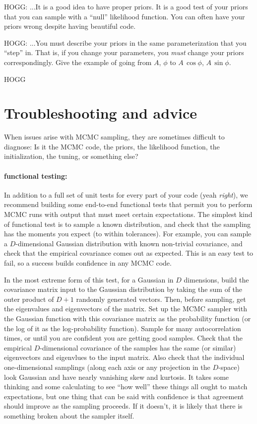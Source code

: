 \documentclass[12pt,twoside,pdftex]{article}
\begin{document}
HOGG: ...It is a good idea to have proper priors.
It is a good test of your priors that you can sample with a ``null'' likelihood function.
You can often have your priors wrong despite having beautiful code.

HOGG: ...You must describe your priors in the same parameterization that you ``step'' in.
That is, if you change your parameters, you \emph{must} change your priors correspondingly.
Give the example of going from $A$, $\phi$ to $A\,\cos\phi$, $A\,\sin\phi$.

\begin{problem}
HOGG
\end{problem}

\section{Troubleshooting and advice}\label{sec:troubleshooting}

When issues arise with MCMC sampling,
  they are sometimes difficult to diagnose:
Is it the MCMC code, the priors, the likelihood function,
  the initialization, the tuning, or something else?

\paragraph{functional testing:}
In addition to a full set of unit tests for every part of your code
  (yeah \emph{right}),
  we recommend building some end-to-end functional tests that permit you to perform MCMC
  runs with output that must meet certain expectations.
The simplest kind of functional test is to sample a known distribution,
  and check that the sampling has the moments you expect (to within tolerances).
For example, you can sample a $D$-dimensional Gaussian distribution with known non-trivial covariance,
  and check that the empirical covariance comes out as expected.
This is an easy test to fail, so a success builds confidence in any MCMC code.

In the most extreme form of this test,
  for a Gaussian in $D$ dimensions,
  build the covariance matrix input to the Gaussian distribution
  by taking the sum of the outer product of $D+1$ randomly generated vectors.
Then, before sampling, get the eigenvalues and eigenvectors of the matrix.
Set up the MCMC sampler with the Gaussian function with this covariance matrix
  as the probability function (or the log of it as the log-probability function).
Sample for many autocorrelation times,
  or until you are confident you are getting good samples.
Check that the empirical $D$-dimensional covariance of the samples
  has the same (or similar) eigenvectors and eigenvlues to the input matrix.
Also check that the individual one-dimensional samplings
  (along each axis or any projection in the $D$-space)
  look Gaussian and have nearly vanishing skew and kurtosis.
It takes some thinking and some calculating to see ``how well'' these things all ought to match
  expectations, but one thing that can be said with confidence is that agreement should improve
  as the sampling proceeds.
If it doesn't, it is likely that there is something broken about the sampler itself.
\end{document}
